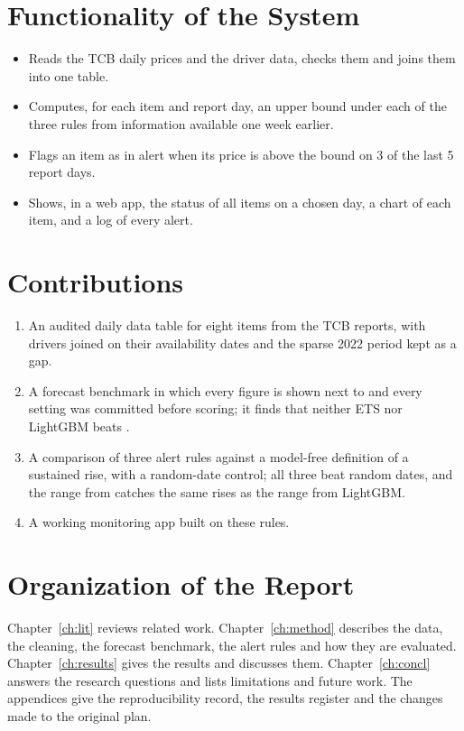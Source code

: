 \section{Functionality of the System}
\begin{itemize}[leftmargin=*,itemsep=2pt]
\item Reads the TCB daily prices and the driver data, checks them and joins them into one table.
\item Computes, for each item and report day, an upper bound under each of the three rules from information available one week earlier.
\item Flags an item as in alert when its price is above the bound on 3 of the last 5 report days.
\item Shows, in a web app, the status of all items on a chosen day, a chart of each item, and a log of every alert.
\end{itemize}

\section{Contributions}
\begin{enumerate}[leftmargin=*,itemsep=2pt]
\item An audited daily data table for eight items from the TCB reports, with drivers joined on their availability dates and the sparse 2022 period kept as a gap.
\item A forecast benchmark in which every figure is shown next to \naive{} and every setting was committed before scoring; it finds that neither ETS nor LightGBM beats \naive{}.
\item A comparison of three alert rules against a model-free definition of a sustained rise, with a random-date control; all three beat random dates, and the range from \naive{} catches the same rises as the range from LightGBM.
\item A working monitoring app built on these rules.
\end{enumerate}

\section{Organization of the Report}
Chapter~\ref{ch:lit} reviews related work. Chapter~\ref{ch:method} describes the data, the cleaning, the forecast benchmark, the alert rules and how they are evaluated. Chapter~\ref{ch:results} gives the results and discusses them. Chapter~\ref{ch:concl} answers the research questions and lists limitations and future work. The appendices give the reproducibility record, the results register and the changes made to the original plan.
